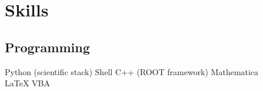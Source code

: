 

\section{Skills}
\subsection{Programming}
Python (scientific stack) \textbullet{} Shell \textbullet{} C++ (ROOT framework) \textbullet{} Mathematica\\
LaTeX \textbullet{} VBA \\ 
\sectionsep
